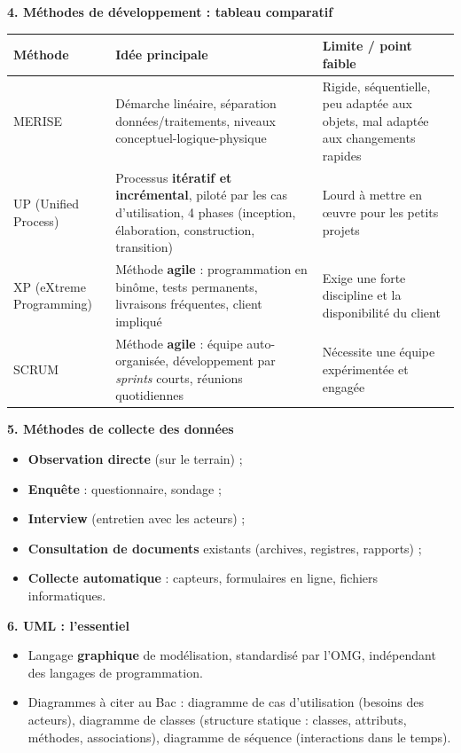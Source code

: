 \documentclass[11pt]{article}
\newcommand{\cle}[1]{{\popxbold\color{popdark}#1}}
\begin{document}
\begin{bilan}
\textbf{4. Méthodes de développement : tableau comparatif}
\begin{center}
\begin{tabularx}{\linewidth}{|l|X|X|}
\hline
\rowcolor{poporangeL} \textbf{Méthode} & \textbf{Idée principale} & \textbf{Limite / point faible} \\
\hline
\cle{MERISE} & Démarche linéaire, séparation données/traitements, niveaux conceptuel-logique-physique & Rigide, séquentielle, peu adaptée aux objets, mal adaptée aux changements rapides \\
\hline
\cle{UP} (Unified Process) & Processus \textbf{itératif et incrémental}, piloté par les cas d'utilisation, 4 phases (inception, élaboration, construction, transition) & Lourd à mettre en œuvre pour les petits projets \\
\hline
\cle{XP} (eXtreme Programming) & Méthode \textbf{agile} : programmation en binôme, tests permanents, livraisons fréquentes, client impliqué & Exige une forte discipline et la disponibilité du client \\
\hline
\cle{SCRUM} & Méthode \textbf{agile} : équipe auto-organisée, développement par \emph{sprints} courts, réunions quotidiennes & Nécessite une équipe expérimentée et engagée \\
\hline
\end{tabularx}
\end{center}

\textbf{5. Méthodes de collecte des données}
\begin{itemize}
  \item \textbf{Observation directe} (sur le terrain) ;
  \item \textbf{Enquête} : questionnaire, sondage ;
  \item \textbf{Interview} (entretien avec les acteurs) ;
  \item \textbf{Consultation de documents} existants (archives, registres, rapports) ;
  \item \textbf{Collecte automatique} : capteurs, formulaires en ligne, fichiers informatiques.
\end{itemize}

\textbf{6. UML : l'essentiel}
\begin{itemize}
  \item Langage \textbf{graphique} de modélisation, standardisé par l'OMG, indépendant des langages de programmation.
  \item Diagrammes à citer au Bac : \cle{diagramme de cas d'utilisation} (besoins des acteurs), \cle{diagramme de classes} (structure statique : classes, attributs, méthodes, associations), \cle{diagramme de séquence} (interactions dans le temps).
\end{itemize}
\end{bilan}
\end{document}
